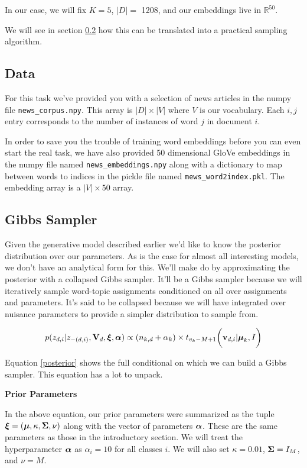 \documentclass[11pt,addpoints,answers]{exam}
\numberwithin{equation}{section} %
\numberwithin{figure}{section} %
\numberwithin{table}{section} %
\begin{document}
In our case, we will fix $K=5$, $|D| = $ 1208, and our embeddings live in $\mathbb{R}^{50}$. 

We will see in section \ref{sec:gibbs} how this can be translated into a practical sampling algorithm. 

\subsection{Data}

For this task we've provided you with a selection of news articles in the numpy file \lstinline{news_corpus.npy}. This array is $|D| \times |V|$ where $V$ is our vocabulary. Each $i, j$ entry corresponds to the number of instances of word $j$ in document $i$. 

In order to save you the trouble of training word embeddings before you can even start the real task, we have also provided 50 dimensional GloVe embeddings in the numpy file named \lstinline{news_embeddings.npy} along with a dictionary to map between words to indices in the pickle file named \lstinline{mews_word2index.pkl}. The embedding array is a $|V|\times 50$ array. 

\subsection{Gibbs Sampler}
\label{sec:gibbs}

Given the generative model described earlier we'd like to know the posterior distribution over our parameters. As is the case for almost all interesting models, we don't have an analytical form for this. We'll make do by approximating the posterior with a collapsed Gibbs sampler. It'll be a Gibbs sampler because we will iteratively sample word-topic assignments conditioned on all over assignments and parameters. It's said to be collapsed because we will have integrated over nuisance parameters to provide a simpler distribution to sample from.   

\begin{equation}
\label{posterior}
    p(z_{d, i} | z_{-(d, i)}, \mathbf{V}_d, \boldsymbol \xi, \boldsymbol \alpha) \propto (n_{k, d} + \alpha_k) \times t_{v_k-M+1}\bigg( \mathbf{v}_{d, i} | \boldsymbol \mu_k, I \bigg)
\end{equation}

Equation \ref{posterior} shows the full conditional on which we can build a Gibbs sampler. This equation has a lot to unpack. 

\textbf{Prior Parameters}

In the above equation, our prior parameters were summarized as the tuple $\boldsymbol \xi = (\boldsymbol \mu, \kappa, \boldsymbol \Sigma, \nu)$ along with the vector of parameters $\boldsymbol \alpha$. These are the same parameters as those in the introductory section. We will treat the hyperparameter $\boldsymbol \alpha$ as $\alpha_i = 10$ for all classes $i$. We will also set $\kappa = 0.01$, $\boldsymbol \Sigma = I_M$, and $\nu = M$.   
\end{document}
